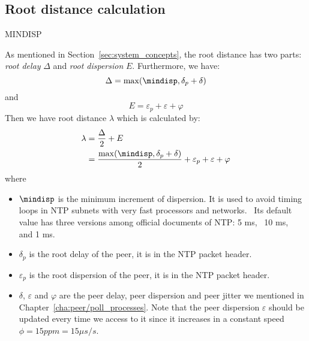 \subsection{Root distance calculation}%
\label{sub:root_distance_calculation}

\begin{myverbbox}
    {\mindisp}MINDISP
\end{myverbbox}

As mentioned in Section~\ref{sec:system_concepts}, the root distance has two
parts: \emph{root delay} $\Delta$ and \emph{root dispersion} $E$. Furthermore, 
we have: 
\begin{equation}
    \Delta = \max(\mindisp, \delta_p + \delta)
    \label{eq:root_delay}
\end{equation}
and
\begin{equation}
    E = \varepsilon_p + \varepsilon + \varphi
    \label{eq:root_dispersion}
\end{equation}
Then we have root distance $\lambda$ which is calculated by:
\begin{align}
    \lambda & = \frac{\Delta}{2} + E\\
    & =\frac{\max(\mindisp, \delta_p + \delta)}{2} 
    + \varepsilon_p + \varepsilon + \varphi
    \label{eq:root_distance}
\end{align}
where 
\begin{itemize}
    \item $\mindisp$ is the minimum increment of dispersion.  It is used to
        avoid timing loops in NTP subnets with very fast processors and
        networks.~\cite{rfc5905} Its default value has three versions among
        official documents of NTP: 5 ms,~\cite{rfc5905} 10 ms,~\cite{rfc5905}
        and 1 ms.~\cite{performance_metrics}
    \item $\delta_p$ is the root delay of the peer, it is in the NTP packet
        header.
    \item $\varepsilon_p$ is the root dispersion of the peer, it is in the NTP
        packet header.
    \item $\delta$, $\varepsilon$ and $\varphi$  are the peer delay, peer
        dispersion and peer jitter we mentioned in
        Chapter~\ref{cha:peer/poll_processes}. Note that the peer dispersion
        $\varepsilon$ should be updated every time we access to it since it
        increases in a constant speed $\phi = 15 ppm = 15 \mu s/s$.
\end{itemize}

